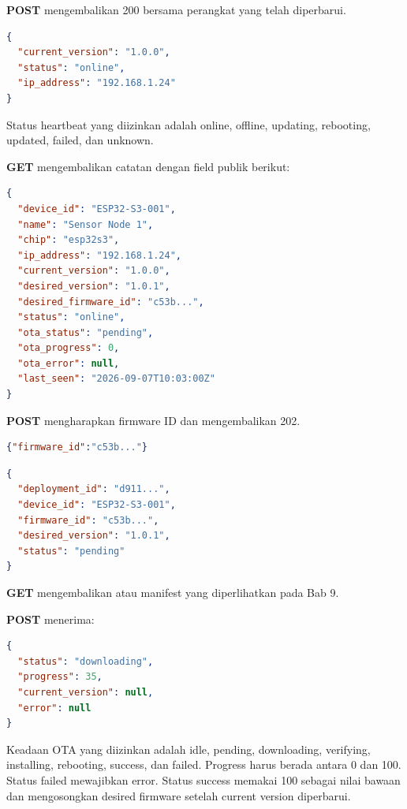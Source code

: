\textbf{POST } mengembalikan 200 bersama perangkat yang telah diperbarui.

\begin{lstlisting}[language=JSON,numbers=none]
{
  "current_version": "1.0.0",
  "status": "online",
  "ip_address": "192.168.1.24"
}
\end{lstlisting}

Status heartbeat yang diizinkan adalah online, offline, updating, rebooting, updated, failed, dan unknown.

\textbf{GET } mengembalikan catatan dengan field publik berikut:

\begin{lstlisting}[language=JSON,numbers=none]
{
  "device_id": "ESP32-S3-001",
  "name": "Sensor Node 1",
  "chip": "esp32s3",
  "ip_address": "192.168.1.24",
  "current_version": "1.0.0",
  "desired_version": "1.0.1",
  "desired_firmware_id": "c53b...",
  "status": "online",
  "ota_status": "pending",
  "ota_progress": 0,
  "ota_error": null,
  "last_seen": "2026-09-07T10:03:00Z"
}
\end{lstlisting}

\textbf{POST } mengharapkan firmware ID dan mengembalikan 202.

\begin{lstlisting}[language=JSON,numbers=none]
{"firmware_id":"c53b..."}
\end{lstlisting}

\begin{lstlisting}[language=JSON,numbers=none]
{
  "deployment_id": "d911...",
  "device_id": "ESP32-S3-001",
  "firmware_id": "c53b...",
  "desired_version": "1.0.1",
  "status": "pending"
}
\end{lstlisting}

\textbf{GET } mengembalikan  atau manifest yang diperlihatkan pada Bab 9.

\textbf{POST } menerima:

\begin{lstlisting}[language=JSON,numbers=none]
{
  "status": "downloading",
  "progress": 35,
  "current_version": null,
  "error": null
}
\end{lstlisting}

Keadaan OTA yang diizinkan adalah idle, pending, downloading, verifying, installing, rebooting, success, dan failed. Progress harus berada antara 0 dan 100. Status failed mewajibkan error. Status success memakai 100 sebagai nilai bawaan dan mengosongkan desired firmware setelah current version diperbarui.

